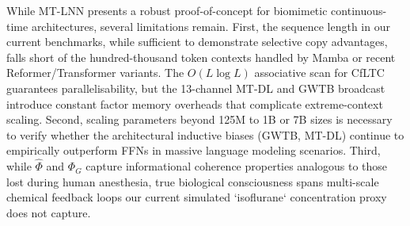 \documentclass[11pt]{article}
\theoremstyle{definition}
\begin{document}
While MT-LNN presents a robust proof-of-concept for biomimetic continuous-time architectures, several limitations remain.
First, the sequence length in our current benchmarks, while sufficient to demonstrate selective copy advantages, falls short of the hundred-thousand token contexts handled by Mamba \citep{gu2023mamba} or recent Reformer/Transformer variants. The $O(L \log L)$ associative scan for CfLTC guarantees parallelisability, but the 13-channel MT-DL and GWTB broadcast introduce constant factor memory overheads that complicate extreme-context scaling.
Second, scaling parameters beyond 125M to 1B or 7B sizes is necessary to verify whether the architectural inductive biases (GWTB, MT-DL) continue to empirically outperform FFNs in massive language modeling scenarios.
Third, while $\hat{\Phi}$ and $\Phi_G$ capture informational coherence properties analogous to those lost during human anesthesia, true biological consciousness spans multi-scale chemical feedback loops our current simulated `isoflurane` concentration proxy does not capture.
\end{document}
